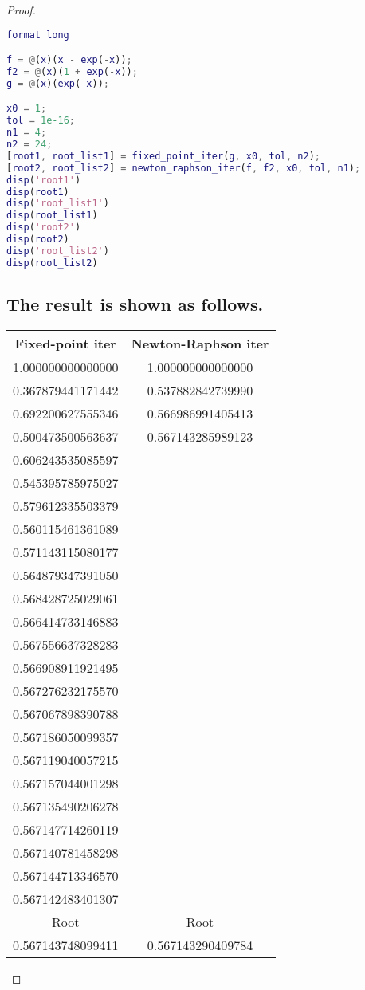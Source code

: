 \documentclass[12pt]{article}
\begin{document}
\begin{proof}
\begin{lstlisting}[language = {MATLAB}]
% homework 1.2.1
format long

f = @(x)(x - exp(-x));
f2 = @(x)(1 + exp(-x));
g = @(x)(exp(-x));

x0 = 1;
tol = 1e-16;
n1 = 4;
n2 = 24;
[root1, root_list1] = fixed_point_iter(g, x0, tol, n2);
[root2, root_list2] = newton_raphson_iter(f, f2, x0, tol, n1);
disp('root1')
disp(root1)
disp('root_list1')
disp(root_list1)
disp('root2')
disp(root2)
disp('root_list2')
disp(root_list2)
\end{lstlisting}
\subsection{The result is shown as follows.}
 \begin{tabular}{c|c}
   \hline
   Fixed-point iter & Newton-Raphson iter\\
   \hline
   1.000000000000000 &  1.000000000000000\\
  \hline
   0.367879441171442 &  0.537882842739990\\
   \hline
   0.692200627555346 &  0.566986991405413\\
   \hline
   0.500473500563637 &  0.567143285989123\\
   \hline
   0.606243535085597 &  \\
   \hline
   0.545395785975027 &  \\
   \hline
   0.579612335503379 &  \\
   \hline
   0.560115461361089 &  \\
   \hline
   0.571143115080177 &  \\
   \hline
   0.564879347391050 &  \\
   \hline
   0.568428725029061 &  \\
   \hline
   0.566414733146883 &  \\
   \hline
   0.567556637328283 &  \\
   \hline
   0.566908911921495 &  \\
   \hline
   0.567276232175570 &  \\
   \hline
   0.567067898390788 &  \\
   \hline
   0.567186050099357 &  \\
   \hline
   0.567119040057215 &  \\
   \hline
   0.567157044001298 &  \\
   \hline
   0.567135490206278 &  \\
   \hline
   0.567147714260119 &  \\
   \hline
   0.567140781458298 &  \\
   \hline
   0.567144713346570 &  \\
   \hline
   0.567142483401307 &  \\
   \hline
   Root &  Root\\
   \hline
   0.567143748099411 & 0.567143290409784\\
   \hline
 \end{tabular}

\end{proof}
\end{document}
